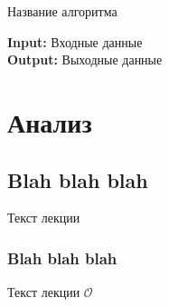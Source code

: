 \documentclass[11pt]{article}
\newcommand{\bigO}{\mathcal{O}}
\theoremstyle{definition}
\begin{document}
        \begin{algorithm}[ph]
        	\caption{Название алгоритма}
        	\label{alg:AlgName}
        	\textbf{Input:} Входные данные \\
        	\textbf{Output:} Выходные данные
        	
        	\begin{algorithmic}[1]
        		
        		\State 
        		\State{} \Return{} 
        	\end{algorithmic}
        
        \end{algorithm}
        
    
    \section{Анализ}
        \subsection{Blah blah blah}
        Текст лекции
        
        \subsubsection{Blah blah blah}
        Текст лекции $\bigO$
        
\end{document}

